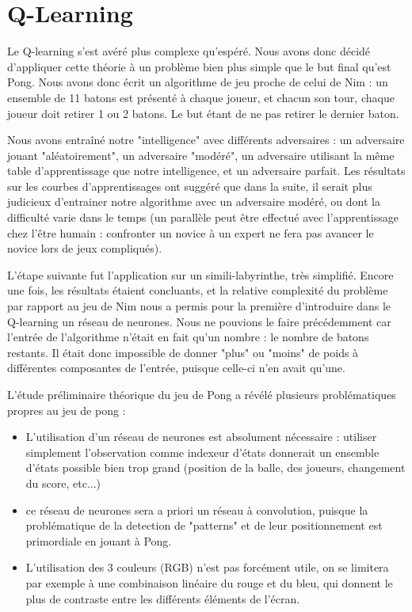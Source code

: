\documentclass[
    10pt,
    a4paper,
    oneside,
    headinclude,footinclude,
    BCOR=5mm,
]{scrartcl}
\begin{document}
\section{Q-Learning}

Le Q-learning s'est avéré plus complexe qu'espéré. 
Nous avons donc décidé d'appliquer cette théorie  à un problème bien plus simple que le but final qu'est Pong. Nous avons donc écrit un algorithme de jeu proche de celui de Nim : un ensemble de 11 batons est présenté à chaque joueur, et chacun son tour, chaque joueur doit retirer 1 ou 2 batons. Le but étant de ne pas retirer le dernier baton.

Nous avons entraîné notre "intelligence" avec différents adversaires : un adversaire jouant "aléatoirement", un adversaire "modéré", un adversaire utilisant la même table d'apprentissage que notre intelligence, et un adversaire parfait. Les résultats sur les courbes d'apprentissages ont suggéré que dans la suite, il serait plus judicieux d'entrainer notre algorithme avec un adversaire modéré, ou dont la difficulté varie dans le temps (un parallèle peut être effectué avec l'apprentissage chez l'être humain : confronter un novice à un expert ne fera pas avancer le novice lors de jeux compliqués).

L'étape suivante fut l'application sur un simili-labyrinthe, très simplifié. Encore une fois, les résultats étaient concluants, et la relative complexité du problème par rapport au jeu de Nim nous a permis pour la première d'introduire dans le Q-learning un réseau de neurones. Nous ne pouvions le faire précédemment car l'entrée de l'algorithme n'était en fait qu'un nombre : le nombre de batons restants. Il était donc impossible de donner "plus" ou "moins" de poids à différentes composantes de l'entrée, puisque celle-ci n'en avait qu'une.

L'étude préliminaire théorique du jeu de Pong a révélé plusieurs problématiques propres au jeu de pong :
\begin{itemize}
	\item L'utilisation d'un réseau de neurones est absolument nécessaire : utiliser simplement l'observation comme indexeur d'états donnerait un ensemble d'états possible bien trop grand (position de la balle, des joueurs, changement du score, etc...)
	\item ce réseau de neurones sera a priori un réseau à convolution, puisque la problématique de la detection de "patterns" et de leur positionnement est primordiale en jouant à Pong.
	\item L'utilisation des 3 couleurs (RGB) n'est pas forcément utile, on se limitera par exemple à une combinaison linéaire du rouge et du bleu, qui donnent le plus de contraste entre les différents éléments de l'écran.
\end{itemize}
\end{document}
